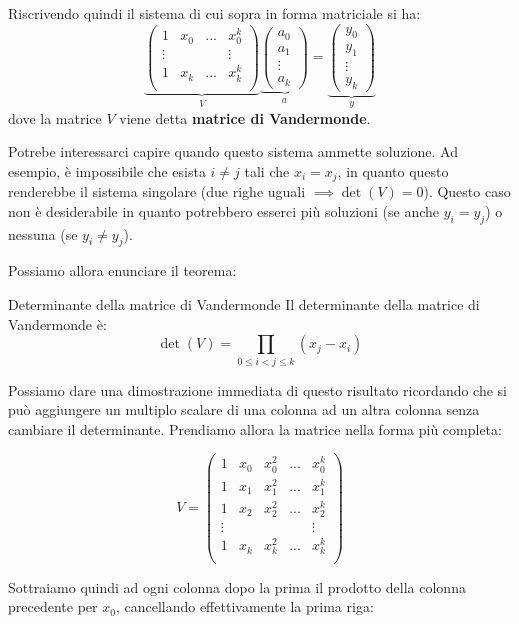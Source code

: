 \documentclass[a4paper,11pt]{article}
\begin{document}
Riscrivendo quindi il sistema di cui sopra in forma matriciale si ha:
$$
\underbrace{
\begin{pmatrix}
	1 & x_0 & ... & x_0^k \\
	\vdots  & & & \vdots \\
	1 & x_k & ... & x_k^k \\
\end{pmatrix}
}_V
\underbrace{
\begin{pmatrix}
	a_0 \\ a_1 \\ \vdots \\ a_k
\end{pmatrix}
}_a
=
\underbrace{
\begin{pmatrix}
	y_0 \\ y_1 \\ \vdots \\ y_k 
\end{pmatrix}
}_y
$$
dove la matrice $V$ viene detta \textbf{matrice di Vandermonde}.

Potrebe interessarci capire quando questo sistema ammette soluzione.
Ad esempio, è impossibile che esista $i \neq j$ tali che $x_i = x_j$, in quanto questo renderebbe il sistema singolare (due righe uguali $\implies \det(V) = 0$).
Questo caso non è desiderabile in quanto potrebbero esserci più soluzioni (se anche $y_i = y_j$) o nessuna (se $y_i \neq y_j$).

Possiamo allora enunciare il teorema:
\begin{theorem}{Determinante della matrice di Vandermonde}
	Il determinante della matrice di Vandermonde è:
	$$
	\det(V) = \prod_{0 \leq i < j \leq k} (x_j - x_i)
	$$
\end{theorem}
Possiamo dare una dimostrazione immediata di questo risultato ricordando che si può aggiungere un multiplo scalare di una colonna ad un altra colonna senza cambiare il determinante.
Prendiamo allora la matrice nella forma più completa:

$$
V = 
\begin{pmatrix}
	1 & x_0 & x_0^2 & ... & x_0^k \\
	1 & x_1 & x_1^2 & ... & x_1^k \\
	1 & x_2 & x_2^2 & ... & x_2^k \\
	\vdots & & & & \vdots \\
	1 & x_k & x_k^2 & ... & x_k^k \\
\end{pmatrix}
$$

Sottraiamo quindi ad ogni colonna dopo la prima il prodotto della colonna precedente per $x_0$, cancellando effettivamente la prima riga:
\end{document}
